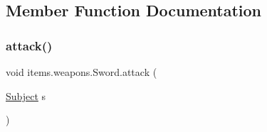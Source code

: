 \subsection{Member Function Documentation}
\mbox{\label{classitems_1_1weapons_1_1_sword_ac33fe7c9eaa35120c38e3b546f44f9c1}} 
\subsubsection{\texorpdfstring{attack()}{attack()}}
{\footnotesize\ttfamily void items.\+weapons.\+Sword.\+attack (\begin{DoxyParamCaption}\item[{\mbox{\hyperlink{classentities_1_1_subject}{Subject}}}]{s }\end{DoxyParamCaption})\hspace{0.3cm}{\ttfamily [inline]}}



